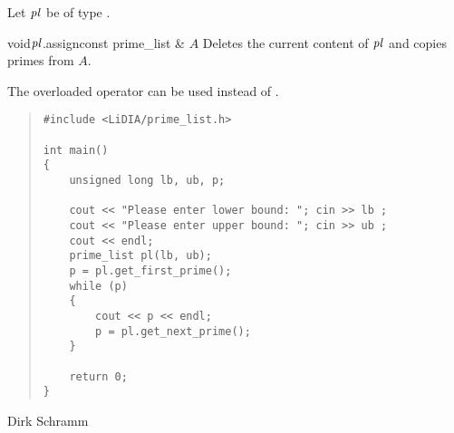 
\ASGN

Let $\mathit{pl}$ be of type .

\begin{fcode}{void}{$\mathit{pl}$.assign}{const prime_list & $A$}
  Deletes the current content of $\mathit{pl}$ and copies primes from $A$.
\end{fcode}

The overloaded operator \code{=} can be used instead of .



\EXAMPLES

\begin{quote}
\begin{verbatim}
#include <LiDIA/prime_list.h>

int main()
{
    unsigned long lb, ub, p;

    cout << "Please enter lower bound: "; cin >> lb ;
    cout << "Please enter upper bound: "; cin >> ub ;
    cout << endl;
    prime_list pl(lb, ub);
    p = pl.get_first_prime();
    while (p)
    {
        cout << p << endl;
        p = pl.get_next_prime();
    }

    return 0;
}
\end{verbatim}
\end{quote}



\AUTHOR

Dirk Schramm
